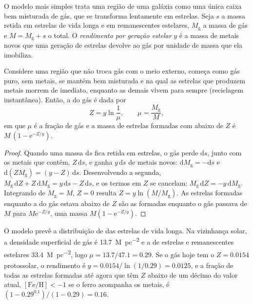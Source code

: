 O modelo mais simples trata uma região de uma galáxia como uma única caixa bem
misturada de gás, que se transforma lentamente em estrelas. Seja $s$ a massa retida em
estrelas de vida longa e em remanescentes estelares, $M_\mathrm{g}$ a massa de gás e
$M = M_\mathrm{g} + s$ o total. O \emph{rendimento por geração estelar} $y$ é a massa de
metais novos que uma geração de estrelas devolve ao gás
por unidade de massa que ela imobiliza.

\begin{theorem}\label{thm:b3:origin-of-elements:closed-box}
Considere uma região que não troca gás com o meio externo, começa como gás puro, sem metais,
se mantém bem misturada e na qual as estrelas que produzem metais morrem de imediato,
enquanto as demais vivem para sempre (reciclagem instantânea). Então, a  do
gás é dada por
\[
Z = y \ln\frac{1}{\mu}, \qquad \mu = \frac{M_\mathrm{g}}{M},
\]
em que $\mu$ é a fração de gás e a massa de estrelas formadas com
 abaixo de $Z$ é \mbox{$M\,(1 - \mathrm{e}^{-Z/y})$}.
\end{theorem}

\begin{proof}
Quando uma massa $\mathrm{d}s$ fica retida em estrelas, o gás perde
$\mathrm{d}s$, junto com os metais que contém, $Z\,\mathrm{d}s$,
e ganha $y\,\mathrm{d}s$ de metais novos:
$\mathrm{d}M_\mathrm{g} = -\mathrm{d}s$ e
$\mathrm{d}(Z M_\mathrm{g}) = (y - Z)\,\mathrm{d}s$. Desenvolvendo a
segunda, $M_\mathrm{g}\,\mathrm{d}Z + Z\,\mathrm{d}M_\mathrm{g} =
y\,\mathrm{d}s - Z\,\mathrm{d}s$, e os termos em $Z$ se cancelam:
$M_\mathrm{g}\,\mathrm{d}Z = -y\,\mathrm{d}M_\mathrm{g}$. Integrando
de $M_\mathrm{g} = M$, $Z = 0$ resulta $Z = y\ln(M/M_\mathrm{g})$. As
estrelas formadas enquanto a  do gás estava abaixo de $Z$ são as formadas
enquanto o gás passava de $M$ para $M\mathrm{e}^{-Z/y}$, uma massa
$M(1 - \mathrm{e}^{-Z/y})$.
\end{proof}

O modelo prevê a distribuição de  das estrelas de vida longa.
Na vizinhança solar, a densidade superficial de gás é
\qty{13.7}{M_\odot.pc^{-2}} e a de estrelas e remanescentes estelares
\qty{33.4}{M_\odot.pc^{-2}}, logo $\mu = 13.7/47.1 = 0.29$. Se o gás
hoje tem o $Z = 0.0154$ protossolar, o rendimento é
$y = 0.0154/\ln(1/0.29) = 0.0125$, e a fração de todas as estrelas
formadas até agora que têm $Z$ abaixo de um décimo do valor atual,
$[\mathrm{Fe/H}] < -1$ se o ferro acompanha os metais, é
$(1 - 0.29^{0.1})/(1 - 0.29) = 0.16$.

